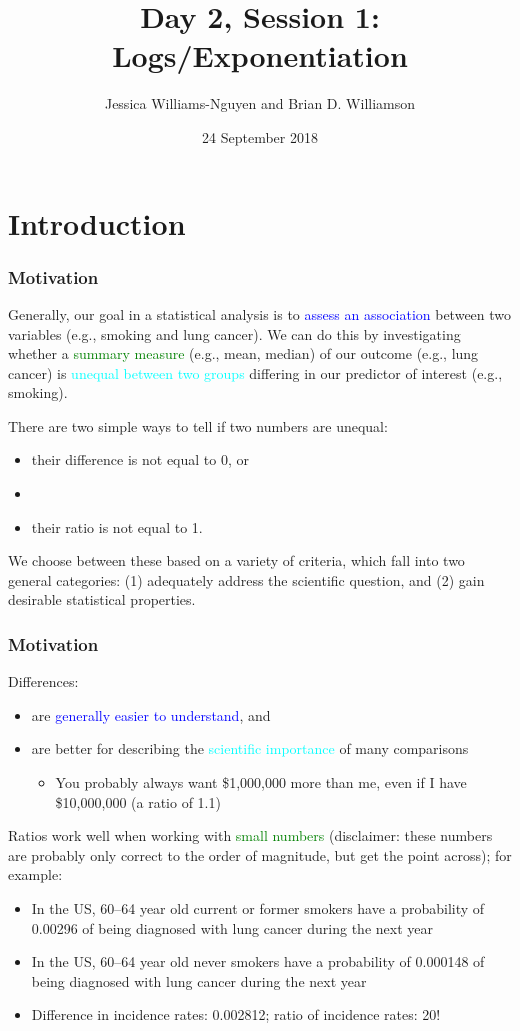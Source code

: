 \documentclass[11pt]{beamer}
\title{Day 2, Session 1: Logs/Exponentiation}
\author{Jessica Williams-Nguyen and Brian D. Williamson}
\institute{EPI/BIOST Bootcamp 2018}
\date{24 September 2018}
\newcommand{\myframe}[1]{\begin{frame} \frametitle{#1}}
\newenvironment{spaceitemize}
{ \begin{itemize}
    \setlength{\itemsep}{10pt}
    \setlength{\parskip}{0pt}
    \setlength{\parsep}{0pt}     }
{ \end{itemize}                  }
\begin{document}
\begin{frame}
\titlepage
\end{frame}

\section{Introduction}
\myframe{Motivation}
Generally, our goal in a statistical analysis is to \textcolor{blue}{assess an association} between two variables (e.g., smoking and lung cancer). We can do this by investigating whether a \textcolor{green}{summary measure} (e.g., mean, median) of our outcome (e.g., lung cancer) is \textcolor{cyan}{unequal between two groups} differing in our predictor of interest (e.g., smoking). \pause

There are two simple ways to tell if two numbers are unequal: 
\begin{itemize}
\item their difference is not equal to 0, or \pause
\item[]
\item their ratio is not equal to 1.
\end{itemize}

We choose between these based on a variety of criteria, which fall into two general categories: (1) adequately address the scientific question, and (2) gain desirable statistical properties.
\end{frame}

\myframe{Motivation}
Differences:
\vspace{-0.5cm}
\begin{spaceitemize}
\item are \textcolor{blue}{generally easier to understand}, and \pause
\item are better for describing the \textcolor{cyan}{scientific importance} of many comparisons
\begin{itemize}
\item You probably always want \$1,000,000 more than me, even if I have \$10,000,000 (a ratio of 1.1)
\end{itemize}
\end{spaceitemize} \pause
Ratios work well when working with \textcolor{green}{small numbers} (disclaimer: these numbers are probably only correct to the order of magnitude, but get the point across); for example: \pause
{\fontsize{10pt}{7.2}\selectfont
\begin{itemize}
\item In the US, 60--64 year old current or former smokers have a probability of 0.00296 of being diagnosed with lung cancer during the next year \pause
\item In the US, 60--64 year old never smokers have a probability of 0.000148 of being diagnosed with lung cancer during the next year \pause
\item Difference in incidence rates: 0.002812; ratio of incidence rates: 20!
\end{itemize}
}
\end{frame}
\end{document}
